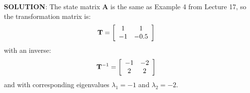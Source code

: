 \textbf{SOLUTION}: The state matrix $\mathbf{A}$ is the same as Example 4 from Lecture 17, so the transformation matrix is:
\[
{\bf{T}} = \left[ {\begin{array}{*{20}c}
   1 & 1  \\
   { - 1} & { - 0.5}  \\
\end{array}} \right]
\]
with an inverse:
\[
{\bf{T}}^{ - 1}  = \left[ {\begin{array}{*{20}c}
   { - 1} & { - 2}  \\
   2 & 2  \\
\end{array}} \right]
\]
and with corresponding eigenvalues $\lambda_1=-1$ and $\lambda_2=-2$.
 
